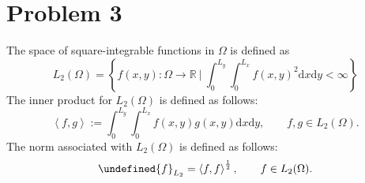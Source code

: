 \documentclass[12pt]{article}
\let\norm\undefined %
\newcommand{\norm}[1]{\left\lVert #1 \right\rVert}
\newcommand{\dotprod}[2]{\left\langle #1, #2 \right\rangle}
\begin{document}
\section*{Problem 3}
The space of square-integrable functions in $\Omega$ is defined as 
\begin{equation}
L_2(\Omega) = \left\{ f(x,y):\Omega\rightarrow\mathbb{R} \ \bigg| \ \int_0^{L_y}\int_0^{L_x} f(x,y)^2 \mathrm{d}x\mathrm{d}y < \infty \right\}
\label{eqn:l2space}
\end{equation}
The inner product for $L_2(\Omega)$ is defined as follows:
\begin{equation}
\dotprod{f}{g} := \int_0^{L_y}\int_0^{L_x} f(x,y)g(x,y) \mathrm{d}x\mathrm{d}y, \qquad f,g \in L_2(\Omega).
\label{eqn:l2_innerprod}
\end{equation}
The norm associated with $L_2(\Omega)$ is defined as follows:
\begin{equation}
\norm{f}_{L_2} = \dotprod{f}{f}^{\frac{1}{2}}, \qquad f \in L_2(\Omega).
\label{eqn:l2_norm}
\end{equation}
\end{document}
